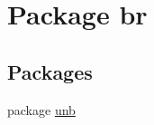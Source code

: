 \hypertarget{namespacebr}{\section{Package br}
\label{namespacebr}
}
\subsection*{Packages}
\begin{DoxyCompactItemize}
\item 
package \hyperlink{namespacebr_1_1unb}{unb}
\end{DoxyCompactItemize}
